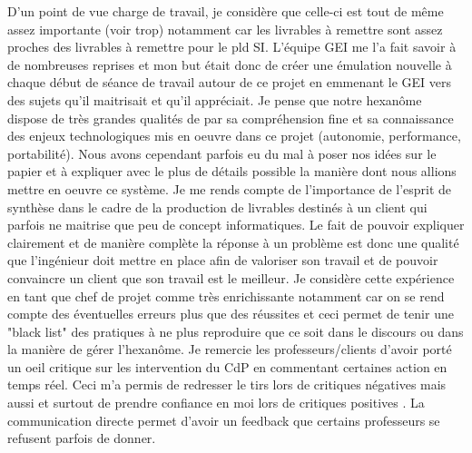 D'un point de vue charge de travail, je considère que celle-ci est tout de même assez importante (voir trop) notamment car les livrables à remettre sont assez proches des livrables à remettre pour le pld SI. L'équipe GEI me l'a fait savoir à de nombreuses reprises et mon but était donc de créer une émulation nouvelle à chaque début de séance de travail autour de ce projet en emmenant le GEI vers des sujets qu'il maitrisait et qu'il appréciait. Je pense que notre hexanôme dispose de très grandes qualités de par sa compréhension fine et sa connaissance des enjeux technologiques mis en oeuvre dans ce projet (autonomie, performance, portabilité). Nous avons cependant parfois eu du mal à poser nos idées sur le papier et à expliquer avec le plus de détails possible la manière dont nous allions mettre en oeuvre ce système. Je me rends compte de l'importance de l'esprit de synthèse dans le cadre de la production de livrables destinés à un client qui parfois ne maitrise que peu de concept informatiques. Le fait de pouvoir expliquer clairement et de manière complète la réponse à un problème est donc une qualité que l'ingénieur doit mettre en place afin de valoriser son travail et de pouvoir convaincre un client que son travail est le meilleur.
\medskip 
\medskip
Je considère cette expérience en tant que chef de projet comme très enrichissante notamment car on se rend compte des éventuelles erreurs plus que des réussites et ceci permet de tenir une "black list" des pratiques à ne plus reproduire que ce soit dans le discours ou dans la manière de gérer l'hexanôme.
Je remercie les professeurs/clients d'avoir porté un oeil critique sur les intervention du CdP en commentant certaines action en temps réel. Ceci m'a permis de redresser le tirs lors de critiques \og négatives \fg mais aussi et surtout de prendre confiance en moi lors de critiques \og positives \fg. La communication directe permet d'avoir un feedback que certains professeurs se refusent parfois de donner.
